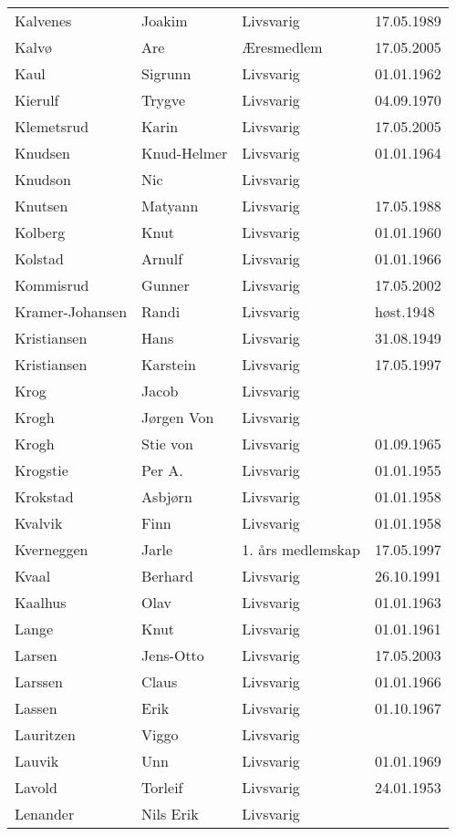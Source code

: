 \begin{longtable}{llll}
Kalvenes	&	Joakim	&	Livsvarig 	&	17.05.1989	\\
Kalvø 	&	Are 	&	Æresmedlem	&	17.05.2005	\\
Kaul	&	Sigrunn	&	Livsvarig 	&	01.01.1962	\\
Kierulf	&	Trygve	&	Livsvarig 	&	04.09.1970	\\
Klemetsrud 	&	Karin	&	Livsvarig	&	17.05.2005	\\
Knudsen	&	Knud-Helmer	&	Livsvarig 	&	01.01.1964	\\
Knudson	&	Nic	&	Livsvarig 	&		\\
Knutsen	&	Matyann	&	Livsvarig 	&	17.05.1988	\\
Kolberg	&	Knut	&	Livsvarig 	&	01.01.1960	\\
Kolstad	&	Arnulf	&	Livsvarig 	&	01.01.1966	\\
Kommisrud 	&	Gunner	&	Livsvarig	&	17.05.2002	\\
Kramer-Johansen	&	Randi	&	Livsvarig 	&	høst.1948	\\
Kristiansen	&	Hans	&	Livsvarig 	&	31.08.1949	\\
Kristiansen 	&	Karstein	&	Livsvarig	&	17.05.1997	\\
Krog	&	Jacob	&	Livsvarig 	&		\\
Krogh	&	Jørgen Von	&	Livsvarig 	&		\\
Krogh	&	Stie von	&	Livsvarig 	&	01.09.1965	\\
Krogstie	&	Per A.	&	Livsvarig 	&	01.01.1955	\\
Krokstad	&	Asbjørn	&	Livsvarig 	&	01.01.1958	\\
Kvalvik	&	Finn	&	Livsvarig 	&	01.01.1958	\\
Kverneggen 	&	Jarle 	&	1. års medlemskap	&	17.05.1997	\\
Kvaal	&	Berhard	&	Livsvarig 	&	26.10.1991	\\
Kaalhus	&	Olav	&	Livsvarig 	&	01.01.1963	\\
Lange	&	Knut	&	Livsvarig 	&	01.01.1961	\\
Larsen 	&	Jens-Otto	&	Livsvarig	&	17.05.2003	\\
Larssen	&	Claus	&	Livsvarig 	&	01.01.1966	\\
Lassen	&	Erik	&	Livsvarig 	&	01.10.1967	\\
Lauritzen	&	Viggo	&	Livsvarig 	&		\\
Lauvik	&	Unn	&	Livsvarig 	&	01.01.1969	\\
Lavold	&	Torleif	&	Livsvarig 	&	24.01.1953	\\
Lenander	&	Nils Erik	&	Livsvarig 	&		\\

\end{longtable}
